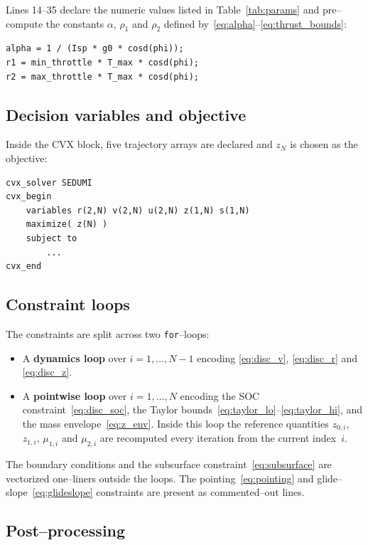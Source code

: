 \documentclass[11pt]{article}
\begin{document}
Lines 14--35 declare the numeric values listed in
Table~\ref{tab:params} and pre--compute the constants
$\alpha$, $\rho_1$ and $\rho_2$ defined
by~\eqref{eq:alpha}--\eqref{eq:thrust_bounds}:

\begin{lstlisting}
alpha = 1 / (Isp * g0 * cosd(phi));
r1 = min_throttle * T_max * cosd(phi);
r2 = max_throttle * T_max * cosd(phi);
\end{lstlisting}

\subsection{Decision variables and objective}

Inside the CVX block, five trajectory arrays are declared and
$z_N$ is chosen as the objective:

\begin{lstlisting}
cvx_solver SEDUMI
cvx_begin
    variables r(2,N) v(2,N) u(2,N) z(1,N) s(1,N)
    maximize( z(N) )
    subject to
        ...
cvx_end
\end{lstlisting}

\subsection{Constraint loops}

The constraints are split across two \texttt{for}--loops:

\begin{itemize}
\item A \textbf{dynamics loop} over $i=1,\dots,N-1$ encoding
      \eqref{eq:disc_v}, \eqref{eq:disc_r} and \eqref{eq:disc_z}.
\item A \textbf{pointwise loop} over $i=1,\dots,N$ encoding
      the SOC constraint~\eqref{eq:disc_soc}, the Taylor
      bounds~\eqref{eq:taylor_lo}--\eqref{eq:taylor_hi}, and the
      mass envelope~\eqref{eq:z_env}.  Inside this loop the
      reference quantities $z_{0,i}$, $z_{1,i}$, $\mu_{1,i}$ and
      $\mu_{2,i}$ are recomputed every iteration from the current
      index~$i$.
\end{itemize}

The boundary conditions and the subsurface
constraint~\eqref{eq:subsurface} are vectorized one--liners
outside the loops.  The pointing~\eqref{eq:pointing} and
glide--slope~\eqref{eq:glideslope} constraints are present as
commented--out lines.

\subsection{Post--processing}
\end{document}
